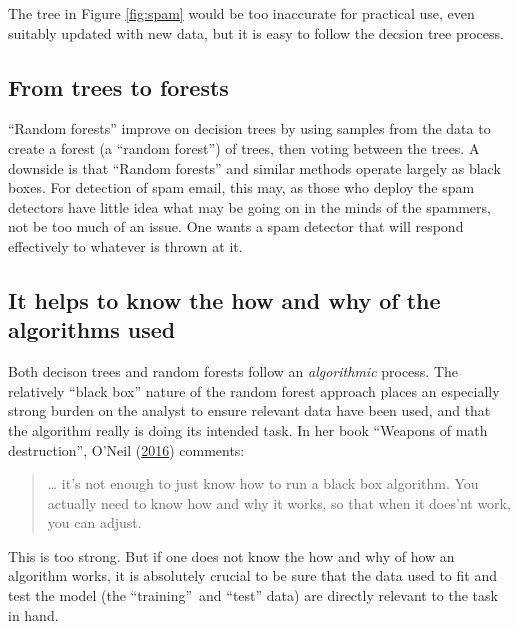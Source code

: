 \documentclass[
  10ptls,
  b5paper]{book}
\begin{document}
The tree in Figure \ref{fig:spam} would be too inaccurate for practical use, even suitably updated with new data, but it is easy to follow the decsion tree process.

\hypertarget{from-trees-to-forests}{%
\subsection*{From trees to forests}\label{from-trees-to-forests}}

``Random forests'' improve on decision trees by using samples from the data to create a forest (a ``random forest'') of trees, then voting between the trees. A downside is that ``Random forests'' and similar methods operate largely as black boxes. For detection of spam email, this may, as those who deploy the spam detectors have little idea what may be going on in the minds of the spammers, not be too much of an issue. One wants a spam detector that will respond effectively to whatever is thrown at it.

\hypertarget{it-helps-to-know-the-how-and-why-of-the-algorithms-used}{%
\subsection*{It helps to know the how and why of the algorithms used}\label{it-helps-to-know-the-how-and-why-of-the-algorithms-used}}

Both decison trees and random forests follow an \emph{algorithmic} process. The relatively ``black box'' nature of the random forest approach places an especially strong burden on the analyst to ensure relevant data have been used, and that the algorithm really is doing its intended task. In her book ``Weapons of math destruction'', O'Neil (\protect\hyperlink{ref-oneil_2016}{2016}) comments:

\begin{quote}
\ldots{} it's not enough to just know how to run a black box algorithm. You actually need to know how and why it works, so that when it does'nt work, you can adjust.
\end{quote}

This is too strong. But if one does not know the how and why of how an algorithm works, it is absolutely crucial to be sure that the data used to fit and test the model (the ``training''~and ``test'' data) are directly relevant to the task in hand.
\end{document}
